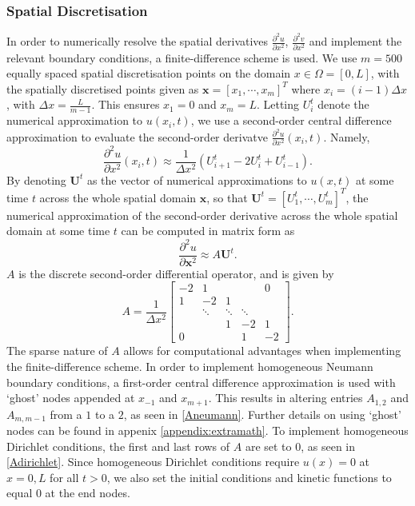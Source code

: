 \documentclass[12pt]{report}
\begin{document}
\subsubsection{Spatial Discretisation}
In order to numerically resolve the spatial derivatives $\frac{\partial^2 u}{\partial x^2}$, $\frac{\partial^2 v}{\partial x^2}$ and implement the relevant boundary conditions, a finite-difference scheme is used. We use $m=500$ equally spaced spatial discretisation points on the domain $x\in\Omega=[0,L]$, with the spatially discretised points given as $\textbf{x}=[x_1,\cdots,x_m]^T$ where $x_i=(i-1)\Delta x$, with $\Delta x=\frac{L}{m-1}$. This ensures $x_1=0$ and $x_m=L$. Letting $U_i^t$ denote the numerical approximation to $u(x_i,t)$, we use a second-order central difference approximation \cite{finitediff} to evaluate the second-order derivatve $\frac{\partial^2 u}{\partial x^2}(x_i,t)$. Namely,
\begin{equation}
\frac{\partial^2 u}{\partial x^2}(x_i,t)\approx\frac{1}{\Delta x^2}\left(U_{i+1}^t-2U_i^t+U_{i-1}^t\right).
\end{equation}
By denoting $\textbf{U}^t$ as the vector of numerical approximations to $u(x,t)$ at some time $t$ across the whole spatial domain $\textbf{x}$, so that $\textbf{U}^t=\left[U_1^t,\cdots,U_m^t\right]^T$, the numerical approximation of the second-order derivative across the whole spatial domain at some time $t$ can be computed in matrix form as
\begin{equation}
    \frac{\partial^2 u}{\partial \textbf{x}^2}\approx A\textbf{U}^t.
\end{equation}
$A$ is the discrete second-order differential operator, and is given by
\begin{equation}\label{A}
A=\frac{1}{\Delta x^2}\begin{bmatrix}
   -2&  1&  &  & 0\\
   1&  -2&  1&  & \\
   &  \ddots&  \ddots&  \ddots& \\
   &  &  1&  -2& 1\\
   0&  &  &  1& -2
  \end{bmatrix}.
\end{equation}
The sparse nature of $A$ allows for computational advantages when implementing the finite-difference scheme. In order to implement homogeneous Neumann boundary conditions, a first-order central difference approximation is used with `ghost' nodes appended at $x_{-1}$ and $x_{m+1}$. This results in altering entries $A_{1,2}$ and $A_{m,m-1}$ from a $1$ to a $2$, as seen in \eqref{Aneumann}. Further details on using `ghost' nodes can be found in appenix \ref{appendix:extramath}. To implement homogeneous Dirichlet conditions, the first and last rows of $A$ are set to $0$, as seen in \eqref{Adirichlet}. Since homogeneous Dirichlet conditions require $u(x)=0$ at $x=0,L$ for all $t>0$, we also set the initial conditions and kinetic functions to equal $0$ at the end nodes.
\end{document}
